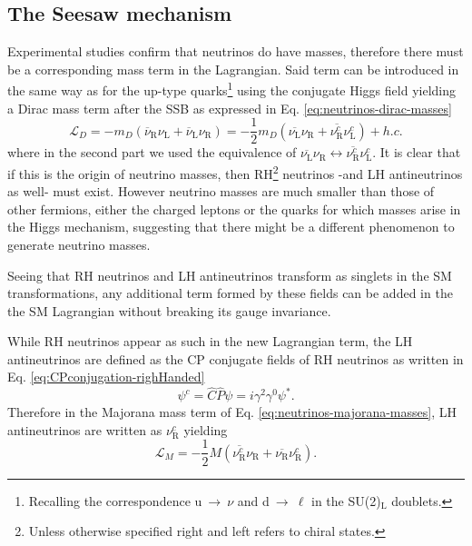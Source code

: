 \subsection{The Seesaw mechanism}
\label{subsec:seesaw}
Experimental studies confirm that neutrinos do have masses, therefore there must be a corresponding mass term in the Lagrangian. 
Said term can be introduced in the same way as for the up-type quarks\footnote{Recalling the correspondence u$~\rightarrow~\nu$ and d$~\rightarrow~\ell$ in the SU(2)$_\text{L}$ doublets.} 
using the conjugate Higgs field yielding a Dirac mass term after the \ac{SSB} as expressed in Eq. \ref{eq:neutrinos-dirac-masses}
\begin{equation}
    \label{eq:neutrinos-dirac-masses}
    \mathcal{L}_{D} = - m_D (\overline{\nu}_\text{R}\nu_\text{L} + \overline{\nu}_\text{L}\nu_\text{R}) = -\frac{1}{2}m_D (\overline{\nu_\text{L}}\nu_\text{R} + \overline{\nu_\text{R}^c}\nu_\text{L}^c) + h.c.
\end{equation}
where in the second part we used the equivalence of $\overline{\nu_\text{L}}\nu_\text{R} \longleftrightarrow \overline{\nu_\text{R}^c}\nu_\text{L}^c $.
It is clear that if this is the origin of neutrino masses, then \ac{RH}\footnote{Unless otherwise specified right and left refers to chiral states.}
neutrinos -and \ac{LH} antineutrinos as well- must exist.
However neutrino masses are much smaller than those of other fermions, either the charged leptons or the quarks for which 
masses arise in the Higgs mechanism, suggesting that there might be a different phenomenon to generate neutrino masses.

Seeing that \ac{RH} neutrinos and \ac{LH} antineutrinos transform as singlets in the \ac{SM} transformations, 
any additional term formed by these fields can be added in the the \ac{SM} Lagrangian without breaking its gauge invariance.

While \ac{RH} neutrinos appear as such in the new Lagrangian term, the \ac{LH} antineutrinos are defined as the \ac{CP} conjugate 
fields of \ac{RH} neutrinos as written in Eq. \ref{eq:CPconjugation-righHanded}
\begin{equation}
    \label{eq:CPconjugation-righHanded}
    \psi^c = \hat{C}\hat{P}\psi = i\gamma^2\gamma^0\psi^*.
\end{equation} 
Therefore in the Majorana mass term of Eq. \ref{eq:neutrinos-majorana-masses}, \ac{LH} antineutrinos are written as $\nu_\text{R}^c$ yielding
\begin{equation}
    \label{eq:neutrinos-majorana-masses}
    \mathcal{L}_M = -\frac{1}{2} M \left( \overline{\nu_\text{R}^c} \nu_\text{R} + \overline{\nu_\text{R}} \nu_\text{R}^c \right).
\end{equation}
 

